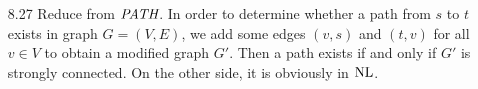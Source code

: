 \begin{itemize}
	\item[8.27]
	Reduce from $\textit{PATH}$. In order to determine whether a path from $s$ to $t$ exists in graph $G = (V, E)$, we add some edges $(v, s)$ and $(t, v)$ for all $v \in V$ to obtain a modified graph $G'$. Then a path exists if and only if $G'$ is strongly connected. On the other side, it is obviously in $\textrm{NL}$.
	
\end{itemize}